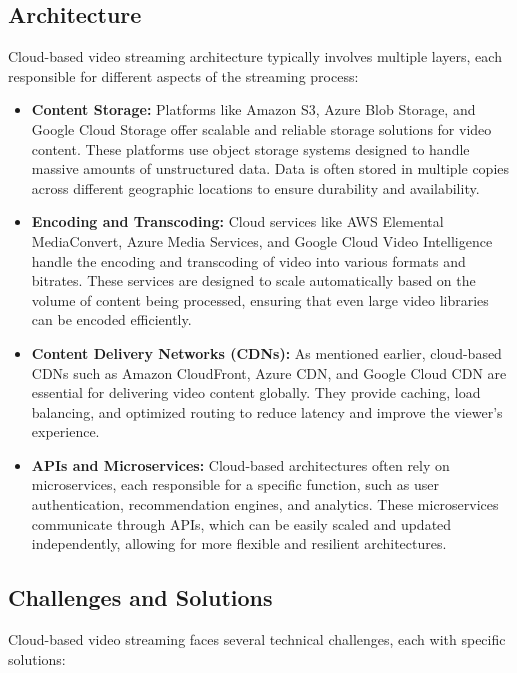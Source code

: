 \subsection{Architecture}
Cloud-based video streaming architecture typically involves multiple layers, each responsible for different aspects of the streaming process:

\begin{itemize}
    \item \textbf{Content Storage:} Platforms like Amazon S3, Azure Blob Storage, and Google Cloud Storage offer scalable and reliable storage solutions for video content. These platforms use object storage systems designed to handle massive amounts of unstructured data. Data is often stored in multiple copies across different geographic locations to ensure durability and availability\cite{cloud_storage_video}.
    
    \item \textbf{Encoding and Transcoding:} Cloud services like AWS Elemental MediaConvert, Azure Media Services, and Google Cloud Video Intelligence handle the encoding and transcoding of video into various formats and bitrates. These services are designed to scale automatically based on the volume of content being processed, ensuring that even large video libraries can be encoded efficiently\cite{cloud_transcoding_video}.
    
    \item \textbf{Content Delivery Networks (CDNs):} As mentioned earlier, cloud-based CDNs such as Amazon CloudFront, Azure CDN, and Google Cloud CDN are essential for delivering video content globally. They provide caching, load balancing, and optimized routing to reduce latency and improve the viewer's experience\cite{cloud_cdn_video}.
    
    \item \textbf{APIs and Microservices:} Cloud-based architectures often rely on microservices, each responsible for a specific function, such as user authentication, recommendation engines, and analytics. These microservices communicate through APIs, which can be easily scaled and updated independently, allowing for more flexible and resilient architectures\cite{microservices_video}.
\end{itemize}

\subsection{Challenges and Solutions}
Cloud-based video streaming faces several technical challenges, each with specific solutions:

